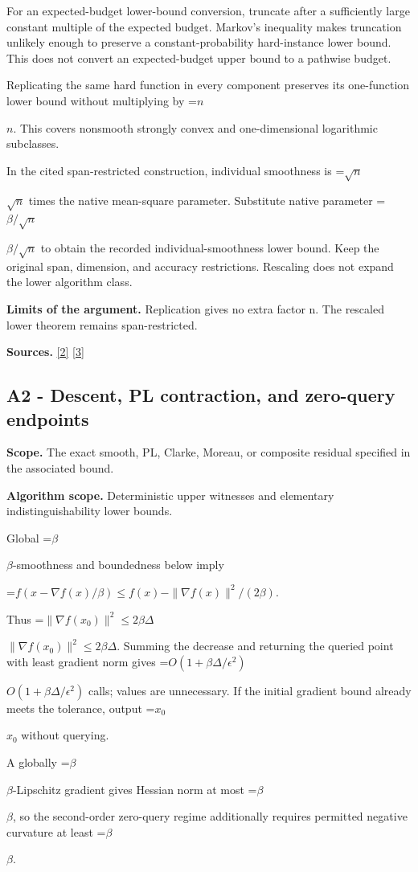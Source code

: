 \documentclass[10pt,a4paper]{article}
\newcommand{\AtlasMath}[1]{\par\begingroup\centering\setbox0=\hbox{$\displaystyle #1$}\ifdim\wd0>1.4\linewidth\typeout{ATLAS WIDE FORMULA: \the\wd0}\fi\ifdim\wd0>\linewidth\resizebox{\linewidth}{!}{\box0}\else\box0\fi\par\endgroup}
\newcommand{\AtlasInlineMath}[1]{\begingroup\setbox0=\hbox{$#1$}\ifdim\wd0>.4\linewidth\endgroup\AtlasMath{#1}\else\endgroup$#1$\fi}
\begin{document}
For an expected-budget lower-bound conversion, truncate after a sufficiently large constant multiple of the expected budget. Markov's inequality makes truncation unlikely enough to preserve a constant-probability hard-instance lower bound. This does not convert an expected-budget upper bound to a pathwise budget.

Replicating the same hard function in every component preserves its one-function lower bound without multiplying by \AtlasInlineMath{n}. This covers nonsmooth strongly convex and one-dimensional logarithmic subclasses.

In the cited span-restricted construction, individual smoothness is \AtlasInlineMath{\sqrt n} times the native mean-square parameter. Substitute native parameter \AtlasInlineMath{\beta/\sqrt n} to obtain the recorded individual-smoothness lower bound. Keep the original span, dimension, and accuracy restrictions. Rescaling does not expand the lower algorithm class.

\textbf{Limits of the argument.} Replication gives no extra factor n. The rescaled lower theorem remains span-restricted.

\textbf{Sources.} \href{https://proceedings.mlr.press/v97/zhou19b/zhou19b.pdf}{[2]} \href{https://arxiv.org/pdf/1405.4980}{[3]}

\subsection{A2 - Descent, PL contraction, and zero-query endpoints}
\textbf{Scope.} The exact smooth, PL, Clarke, Moreau, or composite residual specified in the associated bound.

\textbf{Algorithm scope.} Deterministic upper witnesses and elementary indistinguishability lower bounds.

Global \AtlasInlineMath{\beta}-smoothness and boundedness below imply

\AtlasMath{f(x-\nabla f(x)/\beta)\le f(x)-\|\nabla f(x)\|^2/(2\beta).}

Thus \AtlasInlineMath{\|\nabla f(x_0)\|^2\le2\beta\Delta}. Summing the decrease and returning the queried point with least gradient norm gives \AtlasInlineMath{O(1+\beta\Delta/\epsilon^2)} calls; values are unnecessary. If the initial gradient bound already meets the tolerance, output \AtlasInlineMath{x_0} without querying.

A globally \AtlasInlineMath{\beta}-Lipschitz gradient gives Hessian norm at most \AtlasInlineMath{\beta}, so the second-order zero-query regime additionally requires permitted negative curvature at least \AtlasInlineMath{\beta}.
\end{document}
